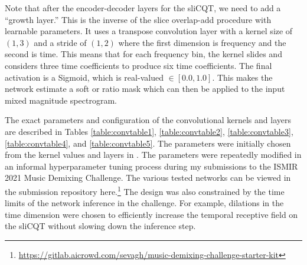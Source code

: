 \documentclass[report.tex]{subfiles}
\begin{document}
Note that after the encoder-decoder layers for the sliCQT, we need to add a ``growth layer.'' This is the inverse of the slice overlap-add procedure with learnable parameters. It uses a transpose convolution layer with a kernel size of $(1, 3)$ and a stride of $(1, 2)$ where the first dimension is frequency and the second is time. This means that for each frequency bin, the kernel slides and considers three time coefficients to produce six time coefficients. The final activation is a Sigmoid, which is real-valued $\in [0.0, 1.0]$. This makes the network estimate a soft or ratio mask which can then be applied to the input mixed magnitude spectrogram.

The exact parameters and configuration of the convolutional kernels and layers are described in Tables \ref{table:convtable1}, \ref{table:convtable2}, \ref{table:convtable3}, \ref{table:convtable4}, and \ref{table:convtable5}. The parameters were initially chosen from the kernel values and layers in \textcite{plumbley1, plumbley2}. The parameters were repeatedly modified in an informal hyperparameter tuning process during my submissions to the ISMIR 2021 Music Demixing Challenge. The various tested networks can be viewed in the submission repository here.\footnote{\url{https://gitlab.aicrowd.com/sevagh/music-demixing-challenge-starter-kit}} The design was also constrained by the time limits of the network inference in the challenge. For example, dilations in the time dimension were chosen to efficiently increase the temporal receptive field on the sliCQT without slowing down the inference step.
\end{document}
